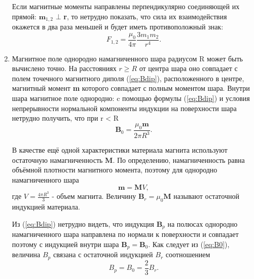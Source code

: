 \begin{enumerate}
Если магнитные моменты направлены перпендикулярно соединяющей их прямой: $\textbf{m}_{1,2}$ $\bot$ \textbf{r}, то нетрудно показать, что сила их взаимодействия окажется в два раза меньшей и будет иметь противоположный
знак:
\begin{equation}
    F_{1,2}=\frac{\mu_0}{4\pi}\frac{3m_1m_2}{r^4}.
    \label{eq:Fbot}
\end{equation}


\item
Магнитное поле однородно намагниченного шара радиусом R может
быть вычислено точно. На расстояниях $r\geq R$ от центра шара оно совпадает с полем точечного магнитного диполя (\ref{eq:Bdip}), расположенного в центре, магнитный момент \textbf{m} которого совпадает с полным моментом шара.
Внутри шара магнитное поле однородно: c помощью формулы (\ref{eq:Bdip}) и условия непрерывности нормальной компоненты индукции на поверхности
шара нетрудно получить, что при r < R
\begin{equation}
    \textbf{B}_0=\frac{\mu_0\textbf{m}}{2\pi R^3}.
    \label{eq:B0}
\end{equation}

В качестве ещё одной характеристики материала магнита используют остаточную намагниченность $\textbf{M}$. По определению, намагниченность равна объёмной плотности магнитного момента, поэтому для однородно намагниченного шара
\begin{equation}
    \textbf{m}=\textbf{M}V,
\end{equation}
где $V=\frac{4\pi R^3}{3}$ - объем магнита. Величину $\textbf{B}_r=\mu_0 \textbf{M}$ называют остаточной индукцией материала.

Из (\ref{eq:Bdip}) нетрудно видеть, что индукция $\textbf{B}_p$ на полюсах однородно намагниченного шара направлена по нормали к поверхности и совпадает
поэтому с индукцией внутри шара $\textbf{B}_p=\textbf{B}_0$. Как следует из (\ref{eq:B0}), величина $B_p$ связана с остаточной индукцией $B_r$ соотношением
\begin{equation}
    B_p=B_0=\frac{2}{3}B_r.
\end{equation}
\end{enumerate}

